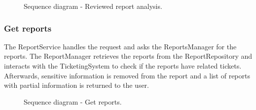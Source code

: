 \begin{figure}[H]
    \centering
    \caption{\label{fig:sequence-reviewed-report-analysis}Sequence diagram - Reviewed report analysis.}
\end{figure}

\subsubsection{Get reports}
The ReportService handles the request and asks the ReportsManager for the reports. The ReportManager retrieves the reports from the ReportRepository and interacts with the TicketingSystem to check if the reports have related tickets. Afterwards, sensitive information is removed from the report and a list of reports with partial information is returned to the user.

\begin{figure}[H]
    \centering
    \caption{\label{fig:sequence-get-reports}Sequence diagram - Get reports.}
\end{figure}


